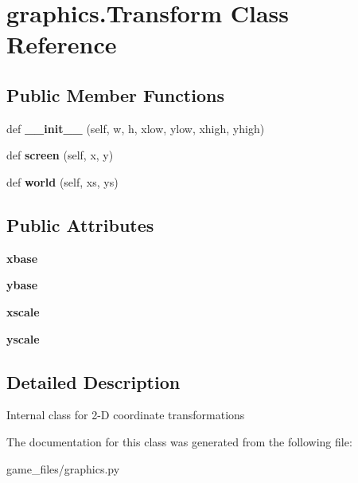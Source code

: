 \hypertarget{classgraphics_1_1Transform}{}\section{graphics.\+Transform Class Reference}
\label{classgraphics_1_1Transform}
\subsection*{Public Member Functions}
\begin{DoxyCompactItemize}
\item 
def {\bfseries \+\_\+\+\_\+init\+\_\+\+\_\+} (self, w, h, xlow, ylow, xhigh, yhigh)\hypertarget{classgraphics_1_1Transform_a826600468986f5938247b1a09dc89097}{}\label{classgraphics_1_1Transform_a826600468986f5938247b1a09dc89097}

\item 
def {\bfseries screen} (self, x, y)\hypertarget{classgraphics_1_1Transform_a52ce3f42703299dcf57d65dbdf856ccc}{}\label{classgraphics_1_1Transform_a52ce3f42703299dcf57d65dbdf856ccc}

\item 
def {\bfseries world} (self, xs, ys)\hypertarget{classgraphics_1_1Transform_adaa57283f32d487d122a5cae919ce1e8}{}\label{classgraphics_1_1Transform_adaa57283f32d487d122a5cae919ce1e8}

\end{DoxyCompactItemize}
\subsection*{Public Attributes}
\begin{DoxyCompactItemize}
\item 
{\bfseries xbase}\hypertarget{classgraphics_1_1Transform_af43d705e45fda80627425215440a0394}{}\label{classgraphics_1_1Transform_af43d705e45fda80627425215440a0394}

\item 
{\bfseries ybase}\hypertarget{classgraphics_1_1Transform_a56bedbb5d2c98e6bf4f1ac28b77688d5}{}\label{classgraphics_1_1Transform_a56bedbb5d2c98e6bf4f1ac28b77688d5}

\item 
{\bfseries xscale}\hypertarget{classgraphics_1_1Transform_aa5d63ba571985d5d70ee661b7e84646f}{}\label{classgraphics_1_1Transform_aa5d63ba571985d5d70ee661b7e84646f}

\item 
{\bfseries yscale}\hypertarget{classgraphics_1_1Transform_aad8322957fc2e0f6b445440f04150c1d}{}\label{classgraphics_1_1Transform_aad8322957fc2e0f6b445440f04150c1d}

\end{DoxyCompactItemize}


\subsection{Detailed Description}
\begin{DoxyVerb}Internal class for 2-D coordinate transformations\end{DoxyVerb}
 

The documentation for this class was generated from the following file\+:\begin{DoxyCompactItemize}
\item 
game\+\_\+files/graphics.\+py\end{DoxyCompactItemize}
